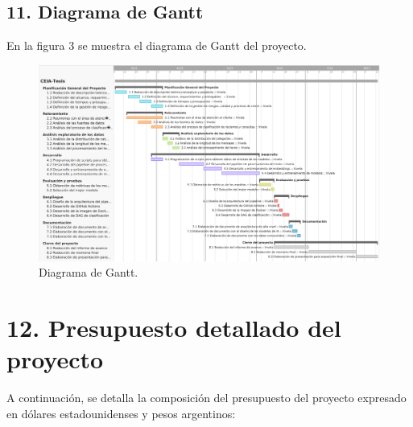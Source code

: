 \documentclass[
11pt, %
]{charter}
\begin{document}
\begin{landscape}
\section{11. Diagrama de Gantt}
\label{sec:gantt}

En la figura 3 se muestra el diagrama de Gantt del proyecto.

\begin{figure}[H]
\centering 
\includegraphics[height=.8\textheight]{./Figuras/figura3.png}
\caption{Diagrama de Gantt.}
\label{fig:diagGantt}
\end{figure}
\end{landscape}



\section{12. Presupuesto detallado del proyecto}
\label{sec:presupuesto}


A continuación, se detalla la composición del presupuesto del proyecto expresado en dólares estadounidenses y pesos argentinos:

\end{document}
